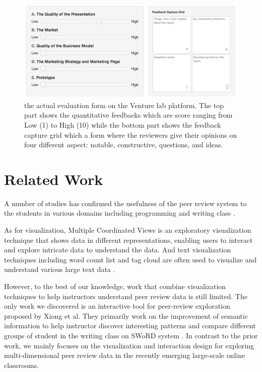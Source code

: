 \documentclass{sigchi}
\begin{document}
\begin{figure}[!t]
\centering
\includegraphics[width=\columnwidth]{images/review-form}
\caption{the actual evaluation form on the Venture lab platform.
The top part shows the quantitative feedbacks which are score ranging
from Low (1) to High (10) while the bottom part shows the feedback capture grid
which a form where the reviewers give their opinions
on four different aspect: notable, constructive, questions, and ideas.}
\label{fig:review-form}
\end{figure}


\section{Related Work}

A number of studies has confirmed the usefulness of the peer review system
to the students in various domains including programming and writing class
\cite{MyPeerReview,WebBasedPeerReview}.

As for visualization, Multiple Coordinated Views is an exploratory visualization
technique that shows data in different representations, enabling users to
interact and explore intricate data to understand the data.  \cite{roberts2007state} And text visualization techniques including
word count list and tag cloud are often used to visualize and understand various
large text data \cite{kuo2007tag} \cite{wordcountwww}.


However, to the best of our knowledge, work that combine visualization
techniques to help instructors understand peer review data is still limited.
The only work we discovered is  an interactive tool for peer-review
exploration proposed by Xiong et al. \cite{xiong} They primarily work on the
improvement of semantic information to help instructor discover interesting
patterns and compare different groups of student in the writing class on SWoRD
system \cite{Cho2007}. In contrast to the prior work, we mainly focuses on the
visualization and interaction design for exploring multi-dimensional peer
review data in the recently emerging large-scale online classrooms.
\end{document}
